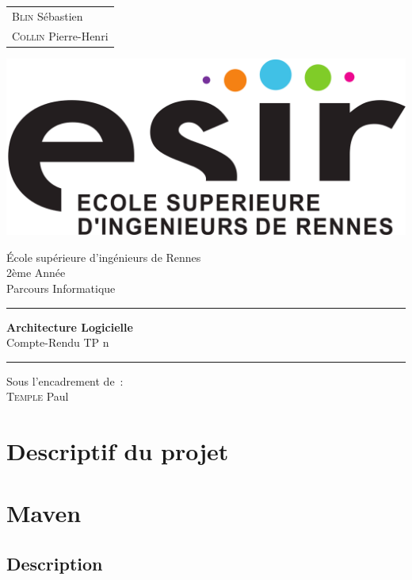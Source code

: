 \documentclass{article}
\begin{document}
\begin{titlepage}
	\vspace{-20px}
	\begin{tabular}{l}
		\textsc{Blin} Sébastien\\
		\textsc{Collin} Pierre-Henri
	\end{tabular}
	\hfill \vspace{10px}\includegraphics[scale=0.1]{../../../esir.png}\\
	\vfill
	\begin{center}
		\Huge{École supérieure d'ingénieurs de Rennes}\\
		\vspace{1cm}
		\LARGE{2ème Année}\\
		\large{Parcours Informatique}\\
		\vspace{0.5cm}\hrule\vspace{0.5cm}
		\LARGE{\textbf{Architecture Logicielle}}\\
		\Large{Compte-Rendu TP n}
		\vspace{0.5cm}\hrule
		\vfill
		\vfill
	\end{center}
	\begin{flushleft}
		\Large{Sous l'encadrement de~:}\\
		\vspace{0.2cm}
		\large{\textsc{Temple} Paul}
	\end{flushleft}
	\vfill
\end{titlepage}

\section{Descriptif du projet}

\section{Maven}
\subsection{Description}
\end{document}
